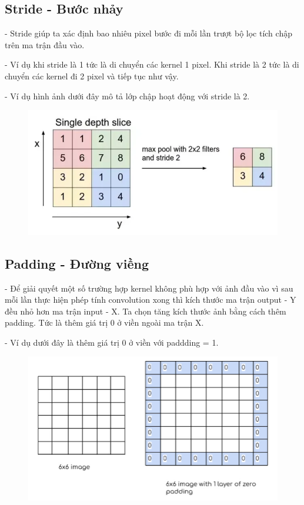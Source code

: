 \documentclass[12pt, a4paper]{article}
\begin{document}
\subsection{Stride - Bước nhảy}
\par \hspace{1cm}-  Stride giúp ta xác định bao nhiêu pixel bước đi mỗi lần trượt bộ lọc tích chập trên ma trận đầu vào. 
\par \hspace{1cm}- Ví dụ khi stride là 1 tức là di chuyển các kernel 1 pixel. Khi stride là 2 tức là di chuyển các kernel đi 2 pixel và tiếp tục như vậy.
\par \hspace{1cm}- Ví dụ hình ảnh dưới đây mô tả lớp chập hoạt động với stride là 2.
\begin{figure}[h] %
    \centering
    \includegraphics[scale = 0.52]{Img/stride1.png}
\end{figure}

\newpage
\subsection{Padding - Đường viềng}
\par \hspace{1cm}- Để giải quyết một số trường hợp kernel không phù hợp với ảnh đầu vào vì sau mỗi lần thực hiện phép tính convolution xong thì kích thước ma trận output - Y đều nhỏ hơn ma trận input - X. Ta chọn tăng kích thước ảnh bằng cách thêm padding. Tức là thêm giá trị 0 ở viền ngoài ma trận X.
\par \hspace{1cm}- Ví dụ dưới đây là thêm giá trị 0 ở viền với paddding = 1.
\begin{figure}[h] %
    \centering
    \includegraphics[scale = 0.8]{Img/padding1.jpg}
\end{figure}
\end{document}
